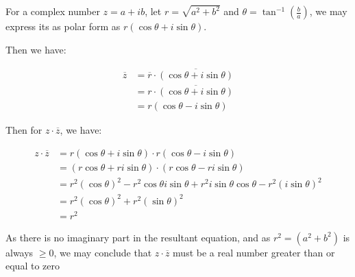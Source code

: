 \documentclass[11pt]{article}
\begin{document}
For a complex number $z = a + ib$, let $r =\sqrt{a^2 + b^2}$ and $\theta = \tan^{-1}(\frac{b}{a})$, we may express its as polar form as
$r(\cos \theta + i\sin \theta)$.

Then we have:

\begin{align*}
    \overline{z} &= \overline{r} \cdot \overline{(\cos \theta + i\sin \theta)} \\
    &= r \cdot  \overline{(\cos \theta + i\sin \theta)}  \\
    &= r (\cos \theta - i\sin \theta)
\end{align*}

Then for $z \cdot \overline{z}$, we have:

\begin{align*}
    z \cdot \overline{z} &= r (\cos \theta + i\sin \theta) \cdot r (\cos \theta - i\sin \theta) \\
    &= (r \cos \theta  + r i\sin \theta) \cdot (r \cos \theta  - r i\sin \theta) \\
    &= r^2 (\cos \theta)^2 - r^2 \cos \theta i \sin \theta + r^2 i \sin \theta \cos \theta - r^2 (i \sin \theta)^2 \\
    &= r^2 (\cos \theta)^2 +  r^2 (\sin \theta)^2 \\
    &= r^2
\end{align*}

As there is no imaginary part in the resultant equation, and as $r^2 = (a^2 + b^2)$ is always $\geq 0$, we may conclude that $z \cdot \overline{z}$ must be a real number greater than or equal to zero
\end{document}
